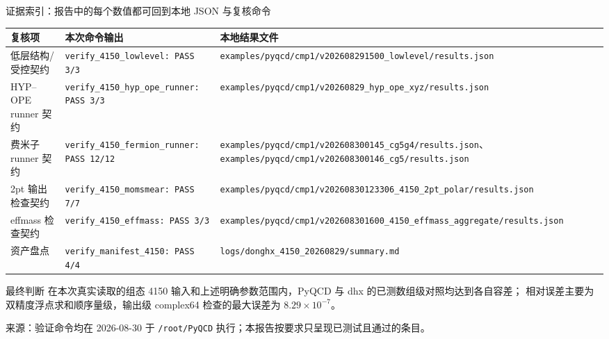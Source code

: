 \documentclass[UTF8,aspectratio=169,11pt]{ctexbeamer}
\newcommand{\source}[1]{\vspace{0.05em}\par{\raggedright\scriptsize\color{muted}来源：#1\par}}
\newcommand{\codepath}[1]{\nolinkurl{#1}}
\begin{document}
\begin{frame}[t]{证据索引：报告中的每个数值都可回到本地 JSON 与复核命令}
  \scriptsize
  \setlength{\tabcolsep}{3pt}
  \begin{tabularx}{0.96\textwidth}{@{}P{0.24\textwidth} P{0.31\textwidth} Y@{}}
    \toprule
    复核项 & 本次命令输出 & 本地结果文件 \\
    \midrule
    低层结构/受控契约 & \texttt{verify\_4150\_lowlevel: PASS 3/3} & \codepath{examples/pyqcd/cmp1/v202608291500_lowlevel/results.json} \\
    HYP--OPE runner 契约 & \texttt{verify\_4150\_hyp\_ope\_runner: PASS 3/3} & \codepath{examples/pyqcd/cmp1/v20260829_hyp_ope_xyz/results.json} \\
    费米子 runner 契约 & \texttt{verify\_4150\_fermion\_runner: PASS 12/12} & \codepath{examples/pyqcd/cmp1/v202608300145_cg5g4/results.json}、\codepath{examples/pyqcd/cmp1/v202608300146_cg5/results.json} \\
    2pt 输出检查契约 & \texttt{verify\_4150\_momsmear: PASS 7/7} & \codepath{examples/pyqcd/cmp1/v20260830123306_4150_2pt_polar/results.json} \\
    effmass 检查契约 & \texttt{verify\_4150\_effmass: PASS 3/3} & \codepath{examples/pyqcd/cmp1/v202608301600_4150_effmass_aggregate/results.json} \\
    资产盘点 & \texttt{verify\_manifest\_4150: PASS 4/4} & \codepath{logs/donghx_4150_20260829/summary.md} \\
    \bottomrule
  \end{tabularx}
  \vspace{0.18em}
  \begin{block}{最终判断}
    在本次真实读取的组态 4150 输入和上述明确参数范围内，PyQCD 与 dhx 的已测数组级对照均达到各自容差；
    相对误差主要为双精度浮点求和顺序量级，输出级 complex64 检查的最大误差为 $8.29\times10^{-7}$。
  \end{block}
  \source{验证命令均在 2026-08-30 于 \codepath{/root/PyQCD} 执行；本报告按要求只呈现已测试且通过的条目。}
\end{frame}
\end{document}
